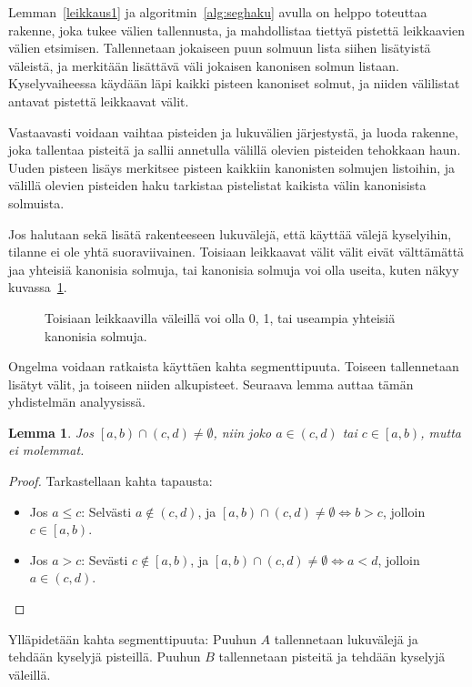 \documentclass[finnish]{tktltiki2}
\newtheorem{lem}[lau]{Lemma}
\theoremstyle{definition}
\theoremstyle{remark}
\newcommand\range[2]{\ensuremath{\left [ #1 , #2 \right )}\xspace}
\newcommand\orange[2]{\ensuremath{\left ( #1 , #2 \right )}\xspace}
\begin{document}
Lemman~\ref{leikkaus1} ja algoritmin~\ref{alg:seghaku} avulla on helppo toteuttaa rakenne, joka tukee välien tallennusta, ja mahdollistaa tiettyä pistettä leikkaavien välien etsimisen.
Tallennetaan jokaiseen puun solmuun lista siihen lisätyistä väleistä, ja merkitään lisättävä väli jokaisen kanonisen solmun listaan.
Kyselyvaiheessa käydään läpi kaikki pisteen kanoniset solmut, ja niiden välilistat antavat pistettä leikkaavat välit.

Vastaavasti voidaan vaihtaa pisteiden ja lukuvälien järjestystä, ja luoda rakenne, joka tallentaa pisteitä ja sallii annetulla välillä olevien pisteiden tehokkaan haun.
Uuden pisteen lisäys merkitsee pisteen kaikkiin kanonisten solmujen listoihin, ja välillä olevien pisteiden haku tarkistaa pistelistat kaikista välin kanonisista solmuista.

Jos halutaan sekä lisätä rakenteeseen lukuvälejä, että käyttää välejä kyselyihin, tilanne ei ole yhtä suoraviivainen.
Toisiaan leikkaavat välit välit eivät välttämättä jaa yhteisiä kanonisia solmuja, tai kanonisia solmuja voi olla useita, kuten näkyy kuvassa~\ref{kanonfailkuva}.

\begin{figure}
\caption{Toisiaan leikkaavilla väleillä voi olla 0, 1, tai useampia yhteisiä kanonisia solmuja.}\label{kanonfailkuva}
\end{figure}

Ongelma voidaan ratkaista käyttäen kahta segmenttipuuta.
Toiseen tallennetaan lisätyt välit, ja toiseen niiden alkupisteet.
Seuraava lemma auttaa tämän yhdistelmän analyysissä.

\begin{lem}\label{segleikkaus2}Jos $\range{a}{b}\cap\orange{c}{d}\neq\emptyset$, niin joko $a\in\orange{c}{d}$ tai $c\in\range{a}{b}$, mutta ei molemmat.\end{lem}
\begin{proof}
Tarkastellaan kahta tapausta:
\begin{itemize}
\item Jos $a\le c$: Selvästi $a\notin\orange{c}{d}$, ja $\range{a}{b}\cap\orange{c}{d}\neq\emptyset \Leftrightarrow b>c$, jolloin $c\in\range{a}{b}$.
\item Jos $a>c$: Sevästi $c\notin\range{a}{b}$, ja $\range{a}{b}\cap\orange{c}{d}\neq\emptyset \Leftrightarrow a<d$, jolloin $a\in\orange{c}{d}$.
\end{itemize}
\end{proof}

Ylläpidetään kahta segmenttipuuta:
Puuhun $A$ tallennetaan lukuvälejä ja tehdään kyselyjä pisteillä.
Puuhun $B$ tallennetaan pisteitä ja tehdään kyselyjä väleillä.
\end{document}
